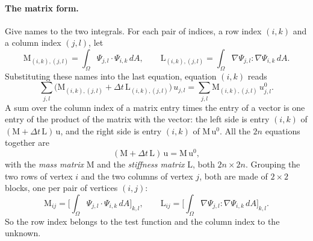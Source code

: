 \paragraph{The matrix form.} Give names to the two integrals. For each pair of indices, a row index $(i, k)$ and a column index $(j, l)$, let
\begin{equation*}
\mathrm M_{(i,k),(j,l)} = \int_\Omega \Psi_{j,l} \cdot \Psi_{i,k}\, dA, \qquad \mathrm L_{(i,k),(j,l)} = \int_\Omega \nabla \Psi_{j,l} : \nabla \Psi_{i,k}\, dA .
\end{equation*}
Substituting these names into the last equation, equation $(i, k)$ reads
\begin{equation*}
\sum_{j,l} \big( \mathrm M_{(i,k),(j,l)} + \Delta t\, \mathrm L_{(i,k),(j,l)}\big)\, u_{j,l} = \sum_{j,l} \mathrm M_{(i,k),(j,l)}\, u^0_{j,l} .
\end{equation*}
A sum over the column index of a matrix entry times the entry of a vector is one entry of the product of the matrix with the vector: the left side is entry $(i, k)$ of $(\mathrm M + \Delta t\,\mathrm L)\,\mathrm u$, and the right side is entry $(i, k)$ of $\mathrm M\,\mathrm u^0$. All the $2n$ equations together are
\begin{equation}
\label{eqn:linear_system}
(\mathrm M + \Delta t\, \mathrm L)\, \mathrm u = \mathrm M\, \mathrm u^0 ,
\end{equation}
with the \emph{mass matrix} $\mathrm M$ and the \emph{stiffness matrix} $\mathrm L$, both $2n \times 2n$. Grouping the two rows of vertex $i$ and the two columns of vertex $j$, both are made of $2 \times 2$ blocks, one per pair of vertices $(i, j)$:
\begin{equation}
\label{eqn:global_blocks}
\mathrm M_{ij} = \Big[ \int_\Omega \Psi_{j,l} \cdot \Psi_{i,k}\, dA \Big]_{k,l}, \qquad \mathrm L_{ij} = \Big[ \int_\Omega \nabla \Psi_{j,l} : \nabla \Psi_{i,k}\, dA \Big]_{k,l}.
\end{equation}
So the row index belongs to the test function and the column index to the unknown.

